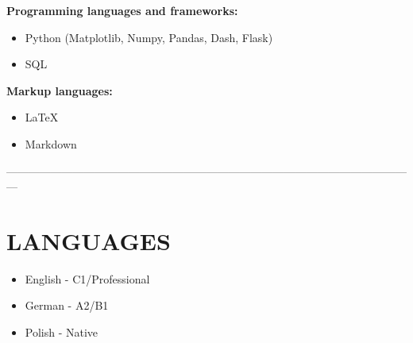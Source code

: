 \documentclass[margin, 10pt]{res} %
\begin{document}
\begin{resume}
\textbf{Programming languages and frameworks:}
\begin{itemize}[noitemsep]
    \item Python (Matplotlib, Numpy, Pandas, Dash, Flask)
    \item SQL
\end{itemize}

\textbf{Markup languages:}
\begin{itemize}[noitemsep]
    \item \LaTeX
    \item Markdown
\end{itemize}

---------------------------------------------------------------------------------------------------------------

\section{LANGUAGES}

\begin{itemize}[noitemsep]
    \item English - C1/Professional
    \item German - A2/B1
    \item Polish - Native
\end{itemize}


\end{resume}

\end{document}

